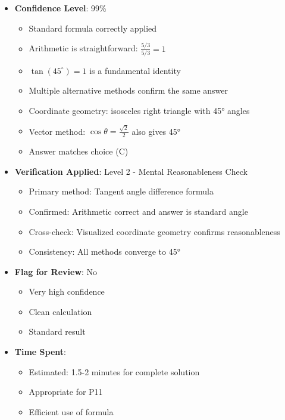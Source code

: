 \documentclass[12pt]{article}
\begin{document}
\begin{itemize}[leftmargin=*]
    \item \textbf{Confidence Level}: 99\% 
    \begin{itemize}
        \item Standard formula correctly applied
        \item Arithmetic is straightforward: $\frac{5/3}{5/3} = 1$
        \item $\tan(45^\circ) = 1$ is a fundamental identity
        \item Multiple alternative methods confirm the same answer
        \item Coordinate geometry: isosceles right triangle with 45° angles
        \item Vector method: $\cos\theta = \frac{\sqrt{2}}{2}$ also gives 45°
        \item Answer matches choice (C)
    \end{itemize}
    \item \textbf{Verification Applied}: Level 2 - Mental Reasonableness Check
    \begin{itemize}
        \item Primary method: Tangent angle difference formula
        \item Confirmed: Arithmetic correct and answer is standard angle
        \item Cross-check: Visualized coordinate geometry confirms reasonableness
        \item Consistency: All methods converge to 45°
    \end{itemize}
    \item \textbf{Flag for Review}: No
    \begin{itemize}
        \item Very high confidence
        \item Clean calculation
        \item Standard result
    \end{itemize}
    \item \textbf{Time Spent}: 
    \begin{itemize}
        \item Estimated: 1.5-2 minutes for complete solution
        \item Appropriate for P11
        \item Efficient use of formula
    \end{itemize}
\end{itemize}
\end{document}
